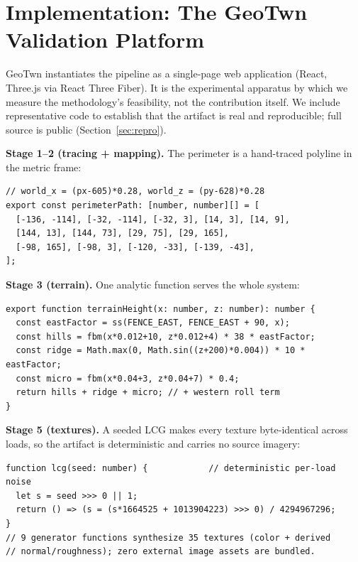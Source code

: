 \documentclass[conference]{IEEEtran}
\begin{document}
\section{Implementation: The GeoTwn Validation Platform}
\label{sec:impl}
GeoTwn instantiates the pipeline as a single-page web application (React, Three.js
via React Three Fiber). It is the experimental apparatus by which we measure the
methodology's feasibility, not the contribution itself. We include representative
code to establish that the artifact is real and reproducible; full source is
public (Section~\ref{sec:repro}).

\textbf{Stage 1--2 (tracing + mapping).} The perimeter is a hand-traced polyline
in the metric frame:
\begin{lstlisting}[caption={Traced perimeter in the metric frame (\texttt{src/lib/site-layout.ts}).},label={lst:layout}]
// world_x = (px-605)*0.28, world_z = (py-628)*0.28
export const perimeterPath: [number, number][] = [
  [-136, -114], [-32, -114], [-32, 3], [14, 3], [14, 9],
  [144, 13], [144, 73], [29, 75], [29, 165],
  [-98, 165], [-98, 3], [-120, -33], [-139, -43],
];
\end{lstlisting}

\textbf{Stage 3 (terrain).} One analytic function serves the whole system:
\begin{lstlisting}[caption={Analytic terrain shared by mesh, foliage, and camera (\texttt{src/lib/terrain.ts}).},label={lst:terrain}]
export function terrainHeight(x: number, z: number): number {
  const eastFactor = ss(FENCE_EAST, FENCE_EAST + 90, x);
  const hills = fbm(x*0.012+10, z*0.012+4) * 38 * eastFactor;
  const ridge = Math.max(0, Math.sin((z+200)*0.004)) * 10 * eastFactor;
  const micro = fbm(x*0.04+3, z*0.04+7) * 0.4;
  return hills + ridge + micro; // + western roll term
}
\end{lstlisting}

\textbf{Stage 5 (textures).} A seeded LCG makes every texture byte-identical
across loads, so the artifact is deterministic and carries no source imagery:
\begin{lstlisting}[caption={Deterministic procedural texture core (\texttt{src/lib/site-textures.ts}).},label={lst:tex}]
function lcg(seed: number) {            // deterministic per-load noise
  let s = seed >>> 0 || 1;
  return () => (s = (s*1664525 + 1013904223) >>> 0) / 4294967296;
}
// 9 generator functions synthesize 35 textures (color + derived
// normal/roughness); zero external image assets are bundled.
\end{lstlisting}
\end{document}
